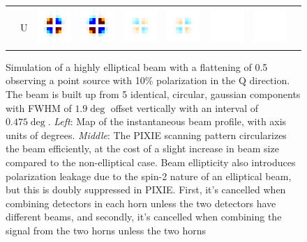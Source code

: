\documentclass{article}
\begin{document}
\begin{figure}
\begin{tabular}{m{35mm}rm{11mm}m{11mm}m{11mm}m{11mm}m{11mm}m{11mm}m{20mm}}
		&
		U &
		\includegraphics[height=14mm]{plots/ellip_mismatch_srcs_sb_det0_crop_2.png} &
		\includegraphics[height=14mm]{plots/ellip_mismatch_srcs_sb_det1_crop_2.png} &
		\includegraphics[height=14mm]{plots/ellip_mismatch_srcs_sb_det01_crop_2.png} &
		\includegraphics[height=14mm]{plots/ellip_mismatch_srcs_sb_det23_crop_2.png} &
		\includegraphics[height=14mm]{plots/ellip_mismatch_srcs_sb_tot_crop_2.png} &
		\includegraphics[height=14mm]{plots/circular_srcs_sb_tot_crop_2.png} &
	\end{tabular}
	\caption{Simulation of a highly elliptical beam with a flattening of 0.5
	observing a point source with 10\% polarization in the Q direction. The
	beam is built up from 5 identical, circular, gaussian components
	with FWHM of $1.9\deg$ offset
	vertically with an interval of $0.475\deg$. \emph{Left}:
	Map of the instantaneous beam profile, with axis units of degrees. \emph{Middle}:
	The PIXIE scanning pattern circularizes the beam efficiently, at the cost
	of a slight increase in beam size compared to the non-elliptical case.
	Beam ellipticity also introduces polarization leakage due to the spin-2
	nature of an elliptical beam, but this is doubly suppressed in PIXIE.
	First, it's cancelled when combining detectors in each horn unless
	the two detectors have different beams, and secondly, it's cancelled
	when combining the signal from the two horns unless the two horns
}
\end{figure}
\end{document}
